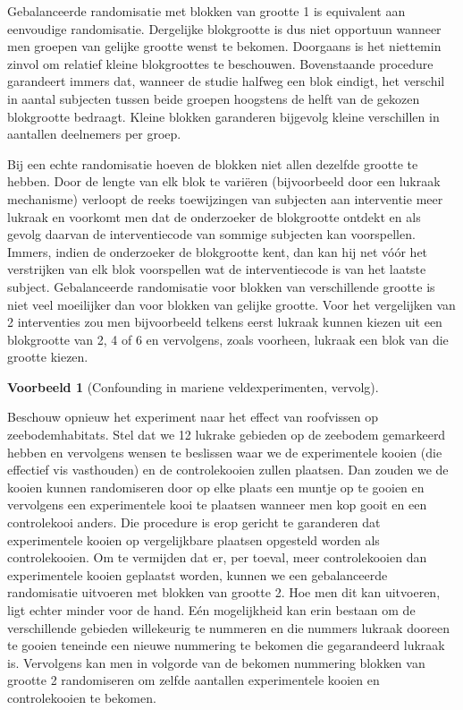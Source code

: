 \documentclass[
  12pt,dutch]{book}
\theoremstyle{definition}
\theoremstyle{definition}
\newtheorem{example}{Voorbeeld}[chapter]
\theoremstyle{definition}
\theoremstyle{definition}
\theoremstyle{remark}
\begin{document}
Gebalanceerde randomisatie met blokken van grootte 1 is equivalent aan
eenvoudige randomisatie. Dergelijke blokgrootte is dus niet opportuun
wanneer men groepen van gelijke grootte wenst te bekomen.
Doorgaans is het niettemin zinvol om relatief kleine blokgroottes te
beschouwen. Bovenstaande procedure garandeert immers dat, wanneer de studie
halfweg een blok eindigt, het verschil in aantal subjecten tussen beide
groepen hoogstens de helft van de gekozen blokgrootte bedraagt.
Kleine blokken garanderen bijgevolg kleine verschillen in aantallen deelnemers per groep.

Bij een echte randomisatie hoeven de blokken niet allen dezelfde grootte te
hebben. Door de lengte van elk blok te variëren (bijvoorbeeld door een
lukraak mechanisme) verloopt de reeks toewijzingen van subjecten aan
interventie meer lukraak en voorkomt men dat de onderzoeker de blokgrootte ontdekt
en als gevolg daarvan de interventiecode van sommige subjecten kan
voorspellen. Immers, indien de onderzoeker de blokgrootte kent, dan kan hij net vóór het verstrijken van elk blok voorspellen wat de interventiecode
is van het laatste subject. Gebalanceerde randomisatie voor blokken
van verschillende grootte is niet veel moeilijker dan voor blokken van
gelijke grootte. Voor het vergelijken van 2 interventies zou men
bijvoorbeeld telkens eerst lukraak kunnen kiezen uit een blokgrootte van 2,
4 of 6 en vervolgens, zoals voorheen, lukraak een blok van die grootte
kiezen.

\begin{example}[Confounding in mariene veldexperimenten, vervolg]
\protect\hypertarget{exm:unnamed-chunk-71}{}\label{exm:unnamed-chunk-71}~
\end{example}

Beschouw opnieuw het experiment naar het effect van roofvissen op zeebodemhabitats. Stel dat we 12 lukrake gebieden op de zeebodem gemarkeerd hebben en vervolgens wensen te beslissen waar we de experimentele kooien (die effectief vis vasthouden) en de controlekooien zullen plaatsen. Dan zouden we de kooien kunnen randomiseren door op elke plaats een muntje op te gooien en vervolgens een experimentele kooi te plaatsen wanneer men kop gooit en een controlekooi anders. Die procedure is erop gericht te garanderen dat experimentele kooien op vergelijkbare plaatsen opgesteld worden als controlekooien. Om te vermijden dat er, per toeval, meer controlekooien dan experimentele kooien geplaatst worden, kunnen we een gebalanceerde randomisatie uitvoeren met blokken van grootte 2. Hoe men dit kan uitvoeren, ligt echter minder voor de hand. Eén mogelijkheid kan erin bestaan om de verschillende gebieden willekeurig te nummeren en die nummers lukraak dooreen te gooien teneinde een nieuwe nummering te bekomen die gegarandeerd lukraak is. Vervolgens kan men in volgorde van de bekomen nummering blokken van grootte 2 randomiseren om zelfde aantallen experimentele kooien en controlekooien te bekomen.
\end{document}
